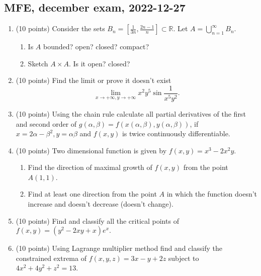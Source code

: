 
\subsection{MFE, december exam, 2022-12-27}



\begin{enumerate}
    \item (10 points) Consider the sets $B_n=\left[ \frac{1}{3n},\frac{2n-1}{n}\right]\subset \mathbb{R}$. 
    Let $A=\bigcup \limits_{n=1}^{\infty}B_n$.  
      \begin{enumerate}
          \item Is $A$ bounded? open? closed? compact?
          \item Sketch $A\times A$. Is it open? closed?
      \end{enumerate} 


  \item (10 points) Find the limit or prove it doesn't exist 
  \[
  \lim_{x\to +\infty, y\to +\infty}x^2y^5\sin {\frac{1}{x^5y^2}}.
  \]

  \item (10 points) Using the chain rule calculate all partial derivatives of the first and second order of $g(\alpha,\beta)=f(x(\alpha,\beta),y(\alpha,\beta))$, 
  if $x=2\alpha-\beta^2, y=\alpha \beta$ and $f(x,y)$ is twice continuously differentiable. 



  \item (10 points) Two dimensional function is given by $f(x,y)=x^3-2x^2y$.
      \begin{enumerate} 
          \item Find the direction of maximal growth of $f(x,y)$ from the point $A(1,1)$.
          \item Find at least one direction from the point $A$ in which the function doesn't increase and doesn't decrease (doesn't change).
      \end{enumerate} 



  \item (10 points) Find and classify all the critical points of  $f(x,y)=(y^2-2xy+x)e^x.$



  \item (10 points) Using Lagrange multiplier method find and classify the constrained extrema of $f(x,y,z)=3x-y+2z$ subject to $4x^2+4y^2+z^2=13$.
\end{enumerate}



